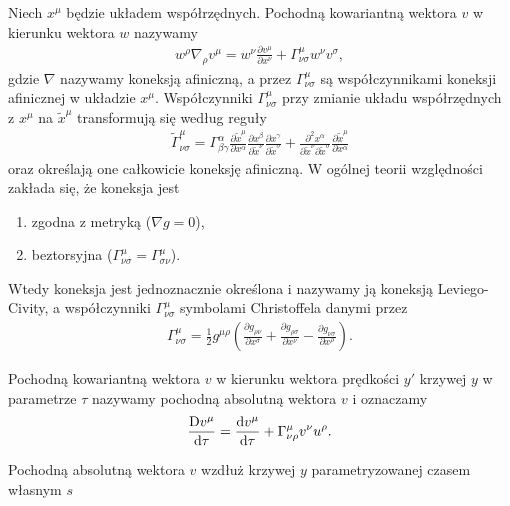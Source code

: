 \begin{definition}
Niech $x^\mu$ będzie układem współrzędnych. 
Pochodną kowariantną wektora $v$ w kierunku wektora $w$ nazywamy
\begin{align*}
w^\rho \nabla_\rho v^\mu = w^\nu \frac{\partial v^\mu}{\partial x^\nu}
+ \Gamma^\mu_{\nu\sigma} w^\nu v^\sigma ,
\end{align*}
gdzie $\nabla$ nazywamy koneksją afiniczną, a przez $\Gamma^\mu_{\nu\sigma} $
są współczynnikami koneksji afinicznej w układzie $x^\mu$. 
Współczynniki $\Gamma^\mu_{\nu\sigma}$ przy zmianie układu współrzędnych z $x^\mu$
na $\tilde{x}^\mu$
transformują się według reguły
\begin{align*}
\tilde{\Gamma}^\mu_{\nu\sigma} = \Gamma^\alpha_{\beta\gamma}
\frac{\partial \tilde{x}^\mu}{\partial x^\alpha }
\frac{\partial x^\beta}{\partial \tilde{x}^\nu }
\frac{\partial x^\gamma}{\partial \tilde{x}^\sigma }
+
\frac{\partial^2 x^\alpha}{\partial \tilde{x}^\nu \partial \tilde{x}^\sigma }
\frac{\partial \tilde{x}^\mu}{\partial x^\alpha }
\end{align*} 
oraz określają one całkowicie koneksję afiniczną.
W ogólnej teorii względności 
zakłada się, że koneksja jest
\begin{enumerate}
    \item zgodna z metryką ($\nabla g =0$),
    \item beztorsyjna ($\Gamma^\mu_{\nu\sigma} 
        = \Gamma^\mu_{\sigma\nu}$).
\end{enumerate} 
Wtedy koneksja jest jednoznacznie określona i nazywamy ją
 koneksją Leviego-Civity, a współczynniki 
$\Gamma^\mu_{\nu\sigma}$ symbolami Christoffela danymi przez
\begin{align*}
\Gamma^\mu_{\nu\sigma} = \frac{1}{2} g^{\mu\rho} 
\left(\frac{\partial g_{\rho\nu}}{\partial x^\sigma}+ 
\frac{\partial g_{\rho\sigma}}{\partial x^\nu}-
\frac{\partial g_{\nu\sigma}}{\partial x^\rho}\right).
\end{align*}
\end{definition}
\begin{definition}
Pochodną kowariantną wektora $v$ w kierunku wektora prędkości
$y'$ krzywej $y$ w parametrze $\tau$ nazywamy
pochodną absolutną wektora $v$ i oznaczamy 
\begin{align*}
\frac{\text{D} v^\mu }{\text{d} \tau } = \frac{\text{d} v^\mu}{\text{d} \tau}
+ \Gamma^\mu_{\nu\rho} v^\nu u^\rho.
\end{align*}
\end{definition}
Pochodną absolutną wektora $v$ wzdłuż krzywej $y$
parametryzowanej czasem własnym $s$
